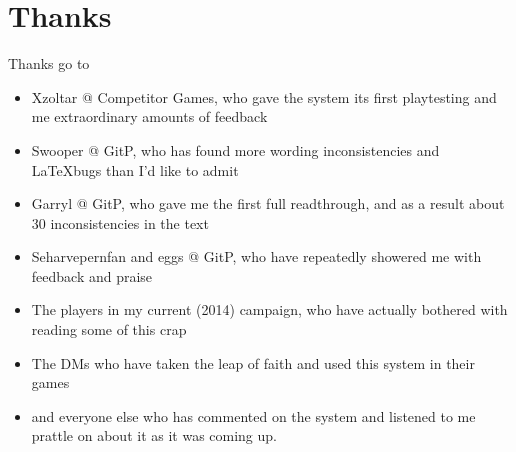 \section{Thanks}
Thanks go to 
\begin{itemize}
 \item Xzoltar @ Competitor Games, who gave the system its first playtesting and me extraordinary amounts of feedback
 \item Swooper @ GitP, who has found more wording inconsistencies and \LaTeX bugs than I'd like to admit
 \item Garryl @ GitP, who gave me the first full readthrough, and as a result about 30 inconsistencies in the text
 \item Seharvepernfan and eggs @ GitP, who have repeatedly showered me with feedback and praise
 \item The players in my current (2014) campaign, who have actually bothered with reading some of this crap
 \item The DMs who have taken the leap of faith and used this system in their games
 \item and everyone else who has commented on the system and listened to me prattle on about it as it was coming up.
\end{itemize}
